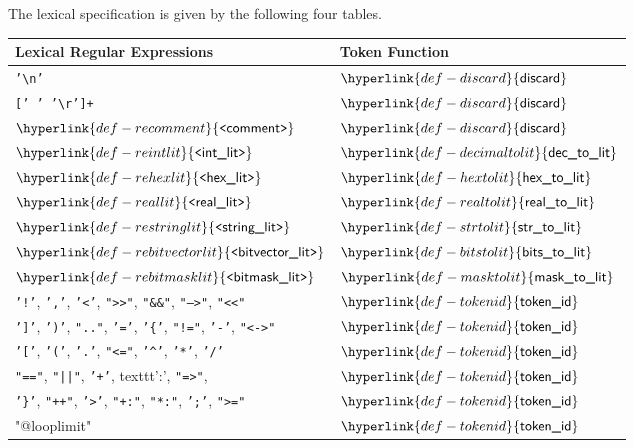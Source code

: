 \documentclass{book}
\newcommand\REintlit[0]{\hyperlink{def-reintlit}{\texttt{<}\textsf{int\_lit}\texttt{>}}}
\newcommand\REhexlit[0]{\hyperlink{def-rehexlit}{\texttt{<}\textsf{hex\_lit}\texttt{>}}}
\newcommand\REreallit[0]{\hyperlink{def-reallit}{\texttt{<}\textsf{real\_lit}\texttt{>}}}
\newcommand\REstringlit[0]{\hyperlink{def-restringlit}{\texttt{<}\textsf{string\_lit}\texttt{>}}}
\newcommand\REbitvectorlit[0]{\hyperlink{def-rebitvectorlit}{\texttt{<}\textsf{bitvector\_lit}\texttt{>}}}
\newcommand\REbitmasklit[0]{\hyperlink{def-rebitmasklit}{\texttt{<}\textsf{bitmask\_lit}\texttt{>}}}
\newcommand\REcomment[0]{\hyperlink{def-recomment}{\texttt{<}\textsf{comment}\texttt{>}}}
\newcommand\discard[0]{\hyperlink{def-discard}{\textsf{discard}}}
\newcommand\decimaltolit[0]{\hyperlink{def-decimaltolit}{\textsf{dec\_to\_lit}}}
\newcommand\hextolit[0]{\hyperlink{def-hextolit}{\textsf{hex\_to\_lit}}}
\newcommand\realtolit[0]{\hyperlink{def-realtolit}{\textsf{real\_to\_lit}}}
\newcommand\strtolit[0]{\hyperlink{def-strtolit}{\textsf{str\_to\_lit}}}
\newcommand\bitstolit[0]{\hyperlink{def-bitstolit}{\textsf{bits\_to\_lit}}}
\newcommand\masktolit[0]{\hyperlink{def-masktolit}{\textsf{mask\_to\_lit}}}
\newcommand\tokenid[0]{\hyperlink{def-tokenid}{\textsf{token\_id}}}
\begin{document}
The lexical specification is given by the following four tables.

\begin{center}
\begin{tabular}{ll}
\textbf{Lexical Regular Expressions} & \textbf{Token Function}\\
\hline
\texttt{'\textbackslash n'}           & $\discard$ \\
\texttt{[' ' '\textbackslash r']+}    & $\discard$ \\
$\REcomment$                          & $\discard$ \\
$\REintlit$                           & $\decimaltolit$ \\
$\REhexlit$                           & $\hextolit$ \\
$\REreallit$                          & $\realtolit$ \\
$\REstringlit$                        & $\strtolit$ \\
$\REbitvectorlit$                     & $\bitstolit$ \\
$\REbitmasklit$                       & $\masktolit$ \\
\texttt{'!'}, \texttt{','}, \texttt{'<'}, \texttt{">>"}, \texttt{"\&\&"}, \texttt{"-->"}, \texttt{"<<"}                         & $\tokenid$  \\
\texttt{']'}, \texttt{')'}, \texttt{".."}, \texttt{'='}, \texttt{'\{'}, \texttt{"!="}, \texttt{'-'}, \texttt{"<->"}                        & $\tokenid$  \\
\texttt{'['}, \texttt{'('}, \texttt{'.'}, \texttt{"<="}, \texttt{'\textasciicircum'}, \texttt{'*'}, \texttt{'/'}                          & $\tokenid$  \\
\texttt{"=="}, \texttt{"||"}, \texttt{'+'}, texttt{':'}, \texttt{"=>"},                          & $\tokenid$  \\
\texttt{'\}'}, \texttt{"++"}, \texttt{'>'}, \texttt{"+:"}, \texttt{"*:"}, \texttt{';'}, \texttt{">="}                         & $\tokenid$  \\
"@looplimit"                          & $\tokenid$  \\
\hline
\end{tabular}
\end{center}
\end{document}
